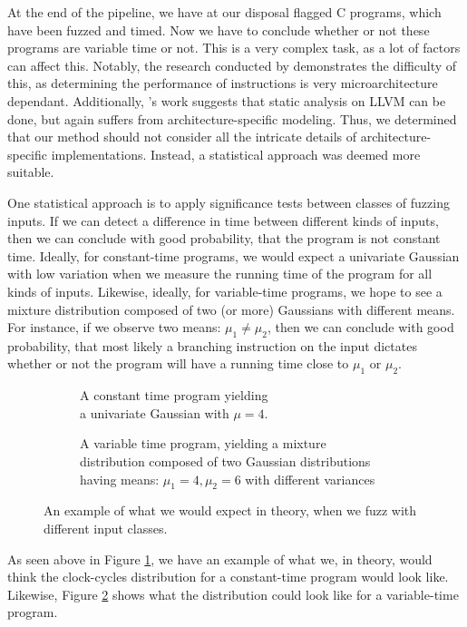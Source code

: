 \label{sec:statistical-analysis}
At the end of the pipeline, we have at our disposal flagged C programs, which have been fuzzed and timed. Now we have to conclude whether or not these programs are variable time or not. This is a very complex task, as a lot of factors can affect this. Notably, the research conducted by \citeauthor{Abel19a} demonstrates the difficulty of this, as determining the performance of instructions is very microarchitecture dependant. Additionally, \cite{Almeida16}'s work suggests that static analysis on LLVM can be done, but again suffers from architecture-specific modeling. Thus, we determined that our method should not consider all the intricate details of architecture-specific implementations. Instead, a statistical approach was deemed more suitable.

One statistical approach is to apply significance tests between classes of fuzzing inputs. If we can detect a difference in time between different kinds of inputs, then we can conclude with good probability, that the program is not constant time. Ideally, for constant-time programs, we would expect a univariate Gaussian with low variation when we measure the running time of the program for all kinds of inputs. Likewise, ideally, for variable-time programs, we hope to see a mixture distribution composed of two (or more) Gaussians with different means. For instance, if we observe two means: $\mu_1 \neq \mu_2$, then we can conclude with good probability, that most likely a branching instruction on the input dictates whether or not the program will have a running time close to $\mu_1$ or $\mu_2$.


\def\gausssolution{5.170045172}
\begin{figure}[H]
\captionsetup[subfigure]{justification=centering}
\begin{subfigure}[t]{0.50\textwidth}
\resizebox{\linewidth}{!}{
    
}%
\caption{A constant time program yielding\\a univariate Gaussian with $\mu = 4$.}
\label{fig:univargauss}
\end{subfigure}
\begin{subfigure}[t]{0.50\textwidth}
\resizebox{\linewidth}{!}{
    
}%
\caption{A variable time program, yielding a mixture\\distribution composed of two Gaussian distributions\\having means: $\mu_1 = 4, \mu_2 = 6$ with different variances}
\label{fig:mixdisgauss}
\end{subfigure}
\caption{An example of what we would expect in theory, when we fuzz with different input classes.}
\label{fig:fuzzclass-statistics-example}
\end{figure}
As seen above in Figure \ref{fig:univargauss}, we have an example of what we, in theory, would think the clock-cycles distribution for a constant-time program would look like. Likewise, Figure \ref{fig:mixdisgauss} shows what the distribution could look like for a variable-time program.

